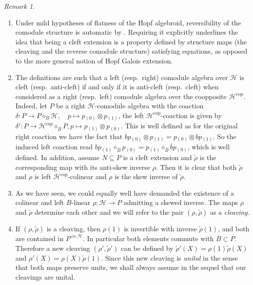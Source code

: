\documentclass[a4paper,reqno]{amsart}
\numberwithin{equation}{section}
\theoremstyle{plain}
\theoremstyle{remark}
\newtheorem{rem}[thm]{Remark}
\numberwithin{equation}{section}
\newcommand{\ot}{\otimes}
\newcommand\ol{\overline}
\newcommand{\BB}{\overline{B}}
\newcommand{\trho}{{\tilde{\rho}}}
\newcommand{\z}{{}_{\scriptscriptstyle{(0)}}}
\renewcommand{\o}{{}_{\scriptscriptstyle{(1)}}}
\newcommand{\CH}{\mathcal{H}}
\newcommand\co{{\operatorname{co}}}
\newcommand\cop{{\operatorname{cop}}}
\begin{document}
\begin{rem}
\begin{enumerate}
    \item Under mild hypotheses of flatness of the Hopf algebroid, reversibility of the comodule structure is automatic by \cite{C20}. Requiring it explicitly underlines the idea that being a cleft extension is a property defined by structure maps (the cleaving and the reverse comodule structure) satisfying equations, as opposed to the more general notion of Hopf Galois extension.
    \item The definitions are such that a left (resp.\ right) comodule algebra over $\CH$ is cleft (resp.\ anti-cleft) if and only if it is anti-cleft (resp.\ cleft) when considered as a right (resp.\ left) comodule algebra over the coopposite $\CH^{\cop}$. Indeed,  let $P$ be a right $\CH$-comodule algebra with the coaction $\delta:P\to P\diamond_{B}\CH,\quad p\mapsto p\z\ot p\o$,  the left $\CH^{cop}$-coaction is given by $\delta': P\to \CH^{cop}\diamond_{\BB} P, p\mapsto p\o\ot p\z$. This is well defined as for the original right coaction we have the fact that $\ol{b}  p\z\ot p\o=p\z\ot b p\o$. So the induced left coaction read 
    $b p\o\diamond_{\BB}p\z=p\o\diamond_{\BB}\ol{b}  p\z$, which is well defined. In addition, assume $N\subseteq P$ is a cleft extension and  $\trho$ is the corresponding map with its anti-skew inverse $\rho$. Then it is clear that both $\trho$ and $\rho$ is left $\CH^{cop}$-colinear and $\rho$ is the skew inverse of $\trho$.
    \item 
    As we have seen, we could equally well have demanded the existence of a colinear and left $B$-linear $\rho\colon \CH\to P$ admitting a skewed inverse. The maps $\rho$ and $\tilde\rho$ determine each other and we will refer to the pair $(\rho,\tilde\rho)$ as a \textit{cleaving}.
    \item If $(\rho,\tilde\rho)$ is a cleaving, then $\rho(1)$ is invertible with inverse $\tilde\rho(1)$, and both are contained in $P^{\co\CH}$. In particular both elements commute with $\ol B\subset P$. Therefore a new cleaving $(\rho',\tilde\rho')$ can be defined by $\tilde\rho'(X)=\rho(1)\tilde\rho(X)$ and $\rho'(X)=\rho(X)\tilde\rho(1)$. Since this new cleaving is \emph{unital} in the sense that both maps preserve units, we shall always assume in the sequel that our cleavings are unital.
\end{enumerate}

\end{rem}
\end{document}
